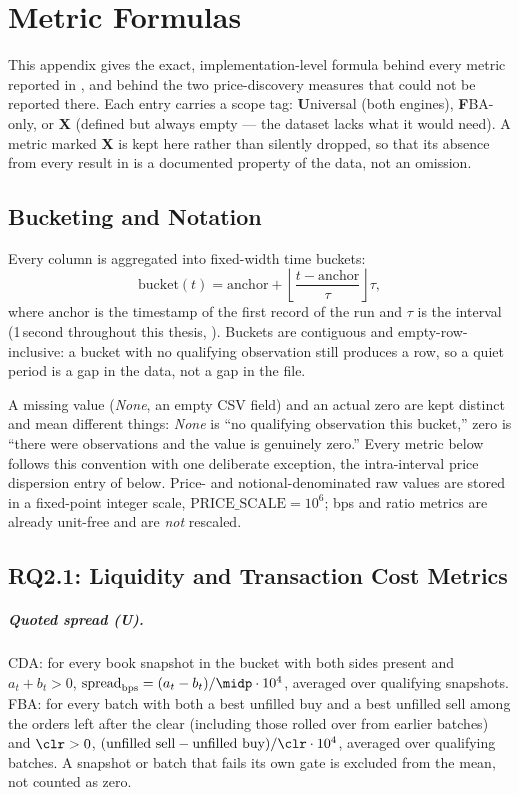 \chapter{Metric Formulas}
\label{app:formulas}

This appendix gives the exact, implementation-level formula behind every
metric reported in , and behind the two price-discovery
measures that could not be reported there. Each entry carries a scope tag:
\textbf{U}niversal (both engines), \textbf{F}BA-only, or \textbf{X} (defined
but always empty --- the dataset lacks what it would need). A metric marked
\textbf{X} is kept here rather than silently dropped, so that its absence
from every result in  is a documented property of the
data, not an omission.

\section{Bucketing and Notation}

Every column is aggregated into fixed-width time buckets:
\begin{equation}
  \mathrm{bucket}(t) = \mathrm{anchor} + \left\lfloor \frac{t -
  \mathrm{anchor}}{\tau} \right\rfloor \tau,
\end{equation}
where $\mathrm{anchor}$ is the timestamp of the first record of the run
and $\tau$ is the interval (1\,second throughout this thesis,
). Buckets are contiguous and empty-row-inclusive: a
bucket with no qualifying observation still produces a row, so a quiet
period is a gap in the data, not a gap in the file.

A missing value (\emph{None}, an empty CSV field) and an actual zero are
kept distinct and mean different things: \emph{None} is ``no qualifying
observation this bucket,'' zero is ``there were observations and the
value is genuinely zero.'' Every metric below follows this convention
with one deliberate exception, the intra-interval price dispersion
entry of  below. Price- and notional-denominated raw
values are stored in a fixed-point integer scale,
$\mathrm{PRICE\_SCALE} = 10^{6}$; bps and ratio metrics are already
unit-free and are \emph{not} rescaled.

\section{RQ2.1: Liquidity and Transaction Cost Metrics}

\paragraph{Quoted spread (U).} CDA: for every book snapshot in the
bucket with both sides present and $a_t + b_t > 0$,
$\mathrm{spread}_{\mathrm{bps}} = (a_t - b_t)/\midp \cdot 10^{4}$,
averaged over qualifying snapshots. FBA: for every batch with both a
best unfilled buy and a best unfilled sell among the orders left after the
clear (including those rolled over from earlier batches) and $\clr > 0$,
$(\text{unfilled sell} - \text{unfilled buy})/\clr \cdot 10^{4}$,
averaged over qualifying batches. A snapshot or batch that fails its own
gate is excluded from the mean, not counted as zero.

